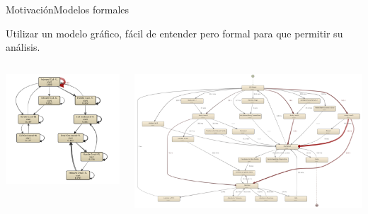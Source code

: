 \documentclass[spanish,pdf]{beamer}
\begin{document}
\begin{frame}{Motivación}{Modelos formales}
  \vspace*{-0.5cm}
  \begin{minipage}[c][0.4\textheight][c]{\linewidth}
    Utilizar un modelo gráfico, fácil de entender pero formal para que permitir su análisis.
  \end{minipage}
  \pause 
  \begin{columns}
      \begin{minipage}[c][0.3\textheight][c]{\linewidth}
        \centering
        \includegraphics[width=1.2\linewidth]{img/ejemplo1.png}
      \end{minipage}
      \begin{minipage}[c][0.3\textheight][c]{\linewidth}
        \centering
        \includegraphics[width=1.2\linewidth]{img/ejemplo2.png}

\end{minipage}
\end{columns}
\end{frame}
\end{document}
